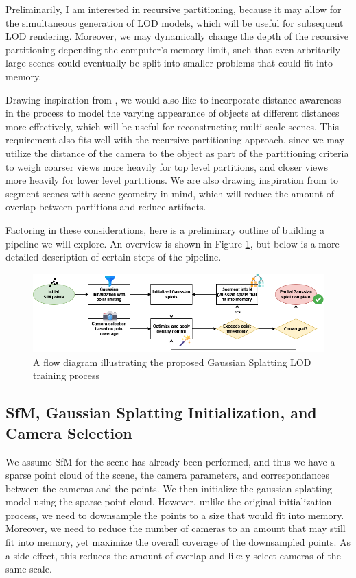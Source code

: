 \documentclass[logo,bsc,singlespacing,parskip]{infthesis}
\begin{document}
Preliminarily, I am interested in recursive partitioning, because it may allow for the simultaneous generation of LOD models, which will be useful for subsequent LOD rendering. Moreover, we may dynamically change the depth of the recursive partitioning depending the computer's memory limit, such that even arbritarily large scenes could eventually be split into smaller problems that could fit into memory.

Drawing inspiration from \cite{bungeenerf}, we would also like to incorporate distance awareness in the process to model the varying appearance of objects at different distances more effectively, which will be useful for reconstructing multi-scale scenes. This requirement also fits well with the recursive partitioning approach, since we may utilize the distance of the camera to the object as part of the partitioning criteria to weigh coarser views more heavily for top level partitions, and closer views more heavily for lower level partitions. We are also drawing inspiration from \cite{spectral} to segment scenes with scene geometry in mind, which will reduce the amount of overlap between partitions and reduce artifacts.

Factoring in these considerations, here is a preliminary outline of building a pipeline we will explore. An overview is shown in Figure \ref{fig:gaussiansplattinglod}, but below is a more detailed description of certain steps of the pipeline.

\begin{figure}[h!]
    \centering
    \includegraphics[width=\textwidth]{images/gslod_process.png}
    \caption{A flow diagram illustrating the proposed Gaussian Splatting LOD training process}
    \label{fig:gaussiansplattinglod}
\end{figure}

\subsection{SfM, Gaussian Splatting Initialization, and Camera Selection}
We assume SfM for the scene has already been performed, and thus we have a sparse point cloud of the scene, the camera parameters, and correspondances between the cameras and the points. We then initialize the gaussian splatting model using the sparse point cloud. However, unlike the original initialization process, we need to downsample the points to a size that would fit into memory. Moreover, we need to reduce the number of cameras to an amount that may still fit into memory, yet maximize the overall coverage of the downsampled points. As a side-effect, this reduces the amount of overlap and likely select cameras of the same scale.
\end{document}
